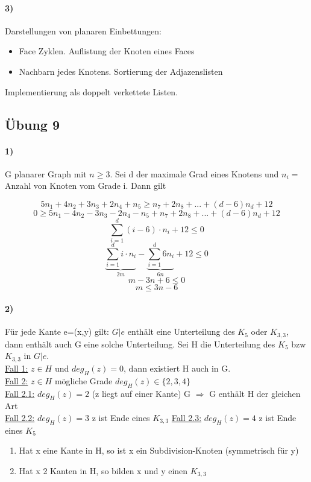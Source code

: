 \paragraph{3)} Darstellungen von planaren Einbettungen:
\begin{itemize}
    \item Face Zyklen. Auflistung der Knoten eines Faces 
    \item Nachbarn jedes Knotens. Sortierung der Adjazenslisten
\end{itemize}
Implementierung als doppelt verkettete Listen.


\subsection{Übung 9}
\paragraph{1)} G planarer Graph mit $ n \geq 3 $. Sei d der maximale Grad eines Knotens und $ n_i = $ Anzahl von Knoten vom Grade i. Dann gilt 

$$ 5n_1 + 4n_2 + 3n_3 + 2n_4 + n_5  \geq n_7 + 2n_8 + ... + (d-6) n_d + 12$$
$$ 0 \geq  5n_1 - 4n_2 - 3n_3 - 2n_4 - n_5 + n_7 + 2n_8 + ... + (d-6) n_d + 12$$
$$ \sum_{i = 1}^{d} (i-6) \cdot n_i +12 \leq 0 $$
$$ \underbrace{\sum_{i = 1}^{d} i \cdot n_i}_{2m} - \underbrace{\sum_{i = 1}^{d} 6 n_i}_{6n} +12 \leq 0 $$
$$ m -3n + 6 \leq 0$$
$$ m  \leq 3n - 6 $$

\paragraph{2)} Für jede Kante e=(x,y) gilt: $ G|e $ enthält eine Unterteilung des $ K_5 $ oder $ K_{3,3} $, dann enthält auch G eine solche Unterteilung. Sei H die Unterteilung des $ K_5 $ bzw $ K_{3,3} $ in $ G|e $.\\
\underline{Fall 1:} $ z \in H $ und $ deg_H(z)=0 $, dann existiert H auch in G. \\
\underline{Fall 2:} $ z \in H$ mögliche Grade  $ deg_H(z) \in \{2, 3, 4 \} $ \\
\underline{Fall 2.1:} $ deg_H(z) = 2 $ (z liegt auf einer Kante) G $ \Rightarrow $ G enthält H der gleichen Art \\
\underline{Fall 2.2:} $ deg_H(z) = 3 $ z ist Ende eines $ K_{3,3} $
\underline{Fall 2.3:} $ deg_H(z) = 4 $ z ist Ende eines $ K_{5} $
\begin{enumerate}
    \item Hat x eine Kante in H, so ist x ein Subdivision-Knoten (symmetrisch für y)
    \item Hat x 2 Kanten in H, so bilden x und y einen $ K_{3,3} $
\end{enumerate}


